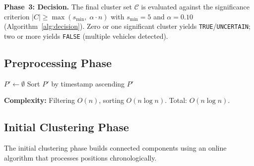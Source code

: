 \textbf{Phase~3: Decision.} The final cluster set $\mathcal{C}$ is evaluated against the significance criterion $|C| \geq \max(s_{\min},\; \alpha \cdot n)$ with $s_{\min} = 5$ and $\alpha = 0.10$ (Algorithm~\ref{alg:decision}). Zero or one significant cluster yields \texttt{TRUE}/\texttt{UNCERTAIN}; two or more yields \texttt{FALSE} (multiple vehicles detected).

\subsection{Preprocessing Phase}

\begin{algorithm}[H]
\caption{Position Preprocessing}
\label{alg:preprocessing}
\BlankLine
$P' \leftarrow \emptyset$\;
Sort $P'$ by timestamp ascending\;
\Return $P'$\;
\end{algorithm}
\vspace{1em}

\textbf{Complexity:} Filtering $O(n)$, sorting $O(n \log n)$. Total: $O(n \log n)$.

\subsection{Initial Clustering Phase}
The initial clustering phase builds connected components using an online algorithm that processes positions chronologically.

